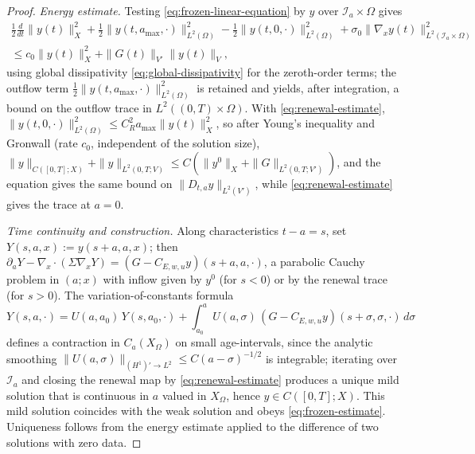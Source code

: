 \documentclass[10pt,a4paper]{amsart}
\begin{document}
\begin{proof}
\emph{Energy estimate.} Testing \eqref{eq:frozen-linear-equation} by $y$ over
$ \mathcal I_a\times \Omega$ gives
\begin{multline*}
\frac12\frac{d}{dt}\|y(t)\|_X^2
+
\frac12\|y(t,a_{\max},\cdot)\|_{L^2(\Omega)}^2
-
\frac12\|y(t,0,\cdot)\|_{L^2(\Omega)}^2
+
\sigma_0\|\nabla_x y(t)\|_{L^2(\mathcal I_a\times\Omega)}^2
\\
\le
c_0\|y(t)\|_X^2
+
\|G(t)\|_{V'}\|y(t)\|_V ,
\end{multline*}
using global dissipativity \eqref{eq:global-dissipativity} for the
zeroth-order terms; the outflow term
$\tfrac12\|y(t,a_{\max},\cdot)\|^2_{L^2(\Omega)}$ is retained and yields, after
integration, a bound on the outflow trace in $L^2((0,T)\times\Omega)$. With
\eqref{eq:renewal-estimate}, $\|y(t,0,\cdot)\|^2_{L^2(\Omega)}\le
C_R^2a_{\max}\|y(t)\|_X^2$, so after Young's inequality and Gronwall (rate
$c_0$, independent of the solution size),
$\displaystyle \|y\|_{C([0,T];X)}+\|y\|_{L^2(0,T;V)}
\le
C(\|y^0\|_X+\|G\|_{L^2(0,T;V')})$,
and the equation gives the same bound on $\|D_{t,a}y\|_{L^2(V')}$, while
\eqref{eq:renewal-estimate} gives the trace at $a=0$.

\emph{Time continuity and construction.} Along characteristics $t-a=s$, set
$Y(s,a,x):=y(s+a,a,x)$; then $\partial_a Y-\nabla_x\cdot(\Sigma\nabla_x Y)=
(G-C_{E,w,u}y)(s+a,a,\cdot)$, a parabolic Cauchy problem in $(a;x)$ with
inflow given by $y^0$ (for $s<0$) or by the renewal trace (for $s>0$). The
variation-of-constants formula
\[
Y(s,a,\cdot)
=
U(a,a_0)\,Y(s,a_0,\cdot)
+
\int_{a_0}^a U(a,\sigma)\,(G-C_{E,w,u}y)(s+\sigma,\sigma,\cdot)\,d\sigma
\]
defines a contraction in $C_a(X_\Omega)$ on small age-intervals, since the
analytic smoothing $\|U(a,\sigma)\|_{(H^1)'\to L^2}\le C(a-\sigma)^{-1/2}$ is
integrable; iterating over $\mathcal I_a$ and closing the renewal map by
\eqref{eq:renewal-estimate} produces a unique mild solution that is continuous
in $a$ valued in $X_\Omega$, hence $y\in C([0,T];X)$. This mild solution
coincides with the weak solution and obeys \eqref{eq:frozen-estimate}.
Uniqueness follows from the energy estimate applied to the difference of two
solutions with zero data.
\end{proof}
\end{document}
